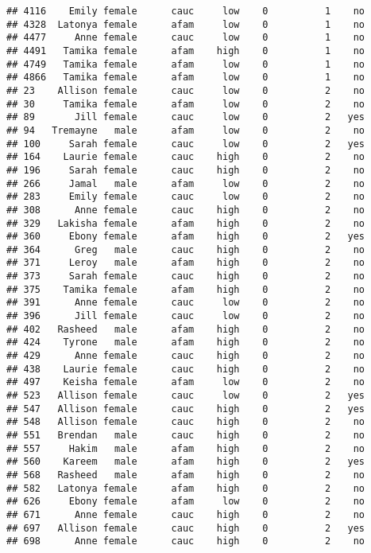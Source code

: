 \documentclass[
]{article}
\begin{document}
\begin{verbatim}
## 4116    Emily female      cauc     low    0          1    no
## 4328  Latonya female      afam     low    0          1    no
## 4477     Anne female      cauc     low    0          1    no
## 4491   Tamika female      afam    high    0          1    no
## 4749   Tamika female      afam     low    0          1    no
## 4866   Tamika female      afam     low    0          1    no
## 23    Allison female      cauc     low    0          2    no
## 30     Tamika female      afam     low    0          2    no
## 89       Jill female      cauc     low    0          2   yes
## 94   Tremayne   male      afam     low    0          2    no
## 100     Sarah female      cauc     low    0          2   yes
## 164    Laurie female      cauc    high    0          2    no
## 196     Sarah female      cauc    high    0          2    no
## 266     Jamal   male      afam     low    0          2    no
## 283     Emily female      cauc     low    0          2    no
## 308      Anne female      cauc    high    0          2    no
## 329   Lakisha female      afam    high    0          2    no
## 360     Ebony female      afam    high    0          2   yes
## 364      Greg   male      cauc    high    0          2    no
## 371     Leroy   male      afam    high    0          2    no
## 373     Sarah female      cauc    high    0          2    no
## 375    Tamika female      afam    high    0          2    no
## 391      Anne female      cauc     low    0          2    no
## 396      Jill female      cauc     low    0          2    no
## 402   Rasheed   male      afam    high    0          2    no
## 424    Tyrone   male      afam    high    0          2    no
## 429      Anne female      cauc    high    0          2    no
## 438    Laurie female      cauc    high    0          2    no
## 497    Keisha female      afam     low    0          2    no
## 523   Allison female      cauc     low    0          2   yes
## 547   Allison female      cauc    high    0          2   yes
## 548   Allison female      cauc    high    0          2    no
## 551   Brendan   male      cauc    high    0          2    no
## 557     Hakim   male      afam    high    0          2    no
## 560    Kareem   male      afam    high    0          2   yes
## 568   Rasheed   male      afam    high    0          2    no
## 582   Latonya female      afam    high    0          2    no
## 626     Ebony female      afam     low    0          2    no
## 671      Anne female      cauc    high    0          2    no
## 697   Allison female      cauc    high    0          2   yes
## 698      Anne female      cauc    high    0          2    no

\end{verbatim}
\end{document}
